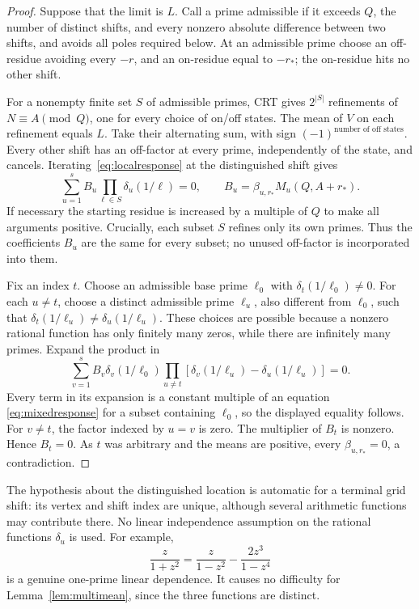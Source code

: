\begin{proof}
Suppose that the limit is $L$. Call a prime admissible if it exceeds
$Q$, the number of distinct shifts, and every nonzero absolute
difference between two shifts, and avoids all poles required below.
At an admissible prime choose an off-residue avoiding every $-r$,
and an on-residue equal to $-r_*$; the on-residue hits no other shift.

For a nonempty finite set $S$ of admissible primes, CRT gives
$2^{|S|}$ refinements of $N\equiv A\pmod Q$, one for every choice
of on/off states. The mean of $V$ on each refinement equals $L$.
Take their alternating sum, with sign $(-1)^{\text{number of off states}}$.
Every other shift has an off-factor at every prime, independently
of the state, and cancels. Iterating~\eqref{eq:localresponse} at the
distinguished shift gives
\begin{equation}\label{eq:mixedresponse}
 \sum_{u=1}^s B_u\prod_{\ell\in S}\delta_u(1/\ell)=0,
 \qquad B_u=\beta_{u,r_*}M_u(Q,A+r_*).
\end{equation}
If necessary the starting residue is increased by a multiple of $Q$
to make all arguments positive. Crucially, each subset $S$ refines
only its own primes. Thus the coefficients $B_u$ are the same for
every subset; no unused off-factor is incorporated into them.

Fix an index $t$. Choose an admissible base prime $\ell_0$ with
$\delta_t(1/\ell_0)\ne0$. For each $u\ne t$, choose a distinct
admissible prime $\ell_u$, also different from $\ell_0$, such that
$\delta_t(1/\ell_u)\ne\delta_u(1/\ell_u)$.
These choices are possible because a nonzero rational function has
only finitely many zeros, while there are infinitely many primes.
Expand the product in
\begin{equation}\label{eq:interpolation}
 \sum_{v=1}^s B_v\delta_v(1/\ell_0)
   \prod_{u\ne t}
   \left[\delta_v(1/\ell_u)-\delta_u(1/\ell_u)\right]=0.
\end{equation}
Every term in its expansion is a constant multiple of an equation
\eqref{eq:mixedresponse} for a subset containing $\ell_0$, so the
displayed equality follows. For $v\ne t$, the factor indexed by
$u=v$ is zero. The multiplier of $B_t$ is nonzero. Hence $B_t=0$.
As $t$ was arbitrary and the means are positive, every
$\beta_{u,r_*}=0$, a contradiction.
\end{proof}

The hypothesis about the distinguished location is automatic for a
terminal grid shift: its vertex and shift index are unique, although
several arithmetic functions may contribute there. No linear
independence assumption on the rational functions $\delta_u$ is used.
For example,
\[
 \frac{z}{1+z^2}=\frac{z}{1-z^2}
                    -\frac{2z^3}{1-z^4}
\]
is a genuine one-prime linear dependence. It causes no difficulty for
Lemma~\ref{lem:multimean}, since the three functions are distinct.

